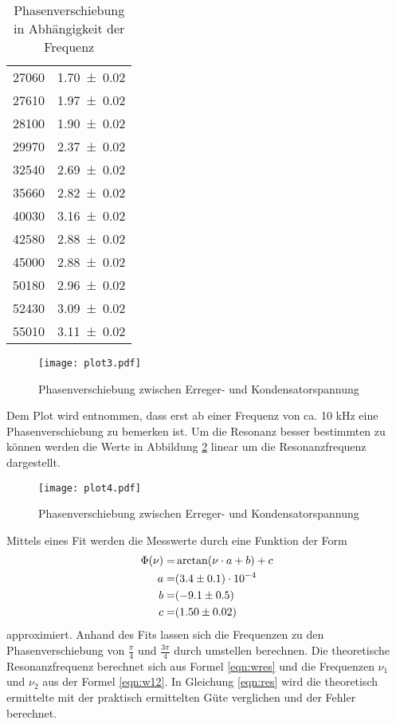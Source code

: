 \begin{table}
\begin{tabular}{c c}
	27060 	& \num{1.70 +- 0.02} \\
	27610 	& \num{1.97 +- 0.02} \\
	28100 	& \num{1.90 +- 0.02} \\
	29970 	& \num{2.37 +- 0.02} \\
	32540 	& \num{2.69 +- 0.02} \\
	35660 	& \num{2.82 +- 0.02} \\
	40030 	& \num{3.16 +- 0.02} \\
	42580 	& \num{2.88 +- 0.02} \\
	45000 	& \num{2.88 +- 0.02} \\
	50180 	& \num{2.96 +- 0.02} \\
	52430 	& \num{3.09 +- 0.02} \\
	55010 	& \num{3.11 +- 0.02} \\
  \end{tabular}
  \caption{Phasenverschiebung in Abhängigkeit der Frequenz}
  \label{tab:phi}
\end{table}
\begin{figure}
  \centering
  \texttt{[image: plot3.pdf]}
  \caption{Phasenverschiebung zwischen Erreger- und Kondensatorspannung}
  \label{fig:logphi}
\end{figure}
Dem Plot wird entnommen, dass erst ab einer Frequenz von ca. 10 kHz eine Phasenverschiebung zu bemerken ist. Um die Resonanz besser bestimmten zu können werden die Werte in Abbildung \ref{fig:Phi} linear um die Resonanzfrequenz dargestellt.
\begin{figure}
  \centering
  \texttt{[image: plot4.pdf]}
  \caption{Phasenverschiebung zwischen Erreger- und Kondensatorspannung}
  \label{fig:Phi}
\end{figure}
Mittels eines Fit werden die Messwerte durch eine Funktion der Form
\begin{eqnarray}
  \Phi (\nu)  =& \arctan(\nu \cdot a + b) + c \\
  \label{pfit}
  a =& (\num{3.4 +- 0.1}) \cdot 10^{-4}\\
  b =& (\num{-9.1 +- 0.5})\\
  c =& (\num{1.50 +- 0.02})\\
\end{eqnarray}
approximiert. Anhand des Fits lassen sich die Frequenzen zu den Phasenverschiebung von $\frac{\pi}{4}$ und $\frac{3 \pi}{4}$ durch umstellen berechnen. Die theoretische Resonanzfrequenz berechnet sich aus Formel \ref{eqn:wres} und die Frequenzen $\nu_1$ und $\nu_2$ aus der Formel \ref{eqn:w12}. In Gleichung \ref{eqn:res} wird die theoretisch ermittelte mit der praktisch ermittelten Güte verglichen und der Fehler berechnet.
